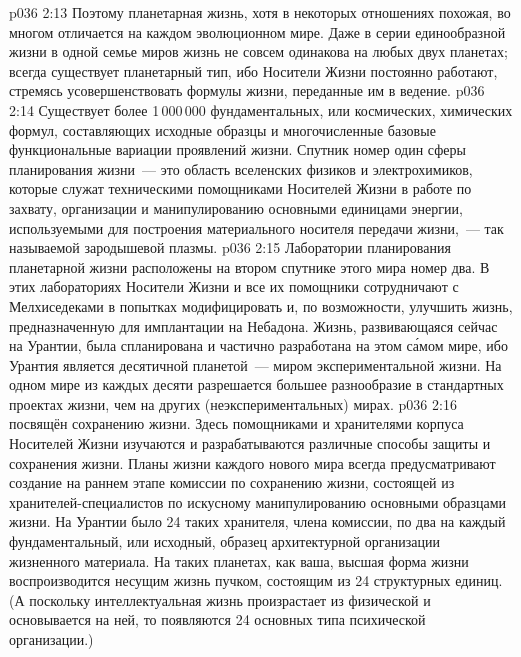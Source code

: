 \vs p036 2:13 Поэтому планетарная жизнь, хотя в некоторых отношениях похожая, во многом отличается на каждом эволюционном мире. Даже в серии единообразной жизни в одной семье миров жизнь не совсем одинакова на любых двух планетах; всегда существует планетарный тип, ибо Носители Жизни постоянно работают, стремясь усовершенствовать формулы жизни, переданные им в ведение.
\vs p036 2:14 Существует более 1\,000\,000 фундаментальных, или космических, химических формул, составляющих исходные образцы и многочисленные базовые функциональные вариации проявлений жизни. Спутник номер один сферы планирования жизни~--- это область вселенских физиков и электрохимиков, которые служат техническими помощниками Носителей Жизни в работе по захвату, организации и манипулированию основными единицами энергии, используемыми для построения материального носителя передачи жизни,~--- так называемой зародышевой плазмы.
\vs p036 2:15 Лаборатории планирования планетарной жизни расположены на втором спутнике этого мира номер два. В этих лабораториях Носители Жизни и все их помощники сотрудничают с Мелхиседеками в попытках модифицировать и, по возможности, улучшить жизнь, предназначенную для имплантации на  Небадона. Жизнь, развивающаяся сейчас на Урантии, была спланирована и частично разработана на этом с\'амом мире, ибо Урантия является десятичной планетой~--- миром экспериментальной жизни. На одном мире из каждых десяти разрешается большее разнообразие в стандартных проектах жизни, чем на других (неэкспериментальных) мирах.
\vs p036 2:16 \pc {} посвящён сохранению жизни. Здесь помощниками и хранителями корпуса Носителей Жизни изучаются и разрабатываются различные способы защиты и сохранения жизни. Планы жизни каждого нового мира всегда предусматривают создание на раннем этапе комиссии по сохранению жизни, состоящей из хранителей\hyp{}специалистов по искусному манипулированию основными образцами жизни. На Урантии было 24 таких хранителя, члена комиссии, по два на каждый фундаментальный, или исходный, образец архитектурной организации жизненного материала. На таких планетах, как ваша, высшая форма жизни воспроизводится несущим жизнь пучком, состоящим из 24 структурных единиц. (А поскольку интеллектуальная жизнь произрастает из физической и основывается на ней, то появляются 24 основных типа психической организации.)
